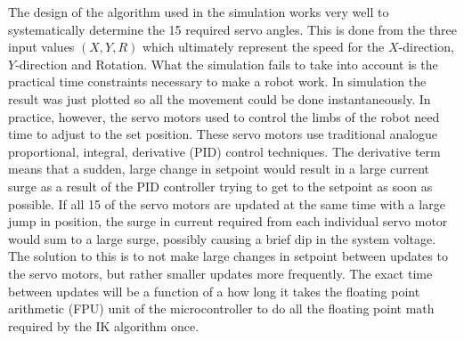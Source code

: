 The design of the algorithm used in the simulation works very well to systematically determine the 15 required servo angles. This is done from the three input values $(X,Y,R)$ which ultimately represent the speed for the $X$-direction, $Y$-direction and Rotation. What the simulation fails to take into account is the practical time constraints necessary to make a robot work. In simulation the result was just plotted so all the movement could be done instantaneously. In practice, however, the servo motors used to control the limbs of the robot need time to adjust to the set position. These servo motors use traditional analogue proportional, integral, derivative (PID) control techniques. The derivative term means that a sudden, large change in setpoint would result in a large current surge as a result of the PID controller trying to get to the setpoint as soon as possible. If all 15 of the servo motors are updated at the same time with a large jump in position, the surge in current required from each individual servo motor would sum to a large surge, possibly causing a brief dip in the system voltage. The solution to this is to not make large changes in setpoint between updates to the servo motors, but rather smaller updates more frequently. The exact time between updates will be a function of a how long it takes the floating point arithmetic (FPU) unit of the microcontroller to do all the floating point math required by the IK algorithm once.
